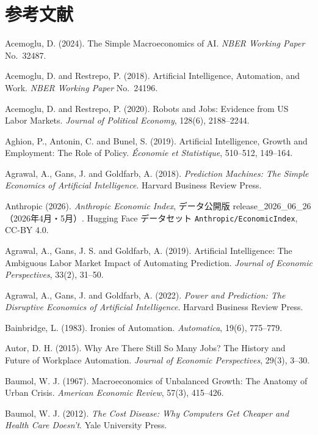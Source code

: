 \documentclass[11pt]{article}
\theoremstyle{plain}
\theoremstyle{definition}
\theoremstyle{remark}
\begin{document}
\section*{参考文献}
\small
\begin{list}{}{\setlength{\leftmargin}{1.4em}\setlength{\itemindent}{-1.4em}\setlength{\itemsep}{2pt}}
\item Acemoglu, D. (2024). The Simple Macroeconomics of AI. \textit{NBER Working Paper} No.\ 32487.
\item Acemoglu, D. and Restrepo, P. (2018). Artificial Intelligence, Automation, and Work. \textit{NBER Working Paper} No.\ 24196.
\item Acemoglu, D. and Restrepo, P. (2020). Robots and Jobs: Evidence from US Labor Markets. \textit{Journal of Political Economy}, 128(6), 2188--2244.
\item Aghion, P., Antonin, C. and Bunel, S. (2019). Artificial Intelligence, Growth and Employment: The Role of Policy. \textit{Économie et Statistique}, 510--512, 149--164.
\item Agrawal, A., Gans, J. and Goldfarb, A. (2018). \textit{Prediction Machines: The Simple Economics of Artificial Intelligence}. Harvard Business Review Press.
\item Anthropic (2026). \textit{Anthropic Economic Index}, データ公開版 release\_2026\_06\_26（2026年4月・5月）. Hugging Face データセット \texttt{Anthropic/EconomicIndex}, CC-BY 4.0.
\item Agrawal, A., Gans, J. S. and Goldfarb, A. (2019). Artificial Intelligence: The Ambiguous Labor Market Impact of Automating Prediction. \textit{Journal of Economic Perspectives}, 33(2), 31--50.
\item Agrawal, A., Gans, J. and Goldfarb, A. (2022). \textit{Power and Prediction: The Disruptive Economics of Artificial Intelligence}. Harvard Business Review Press.
\item Bainbridge, L. (1983). Ironies of Automation. \textit{Automatica}, 19(6), 775--779.
\item Autor, D. H. (2015). Why Are There Still So Many Jobs? The History and Future of Workplace Automation. \textit{Journal of Economic Perspectives}, 29(3), 3--30.
\item Baumol, W. J. (1967). Macroeconomics of Unbalanced Growth: The Anatomy of Urban Crisis. \textit{American Economic Review}, 57(3), 415--426.
\item Baumol, W. J. (2012). \textit{The Cost Disease: Why Computers Get Cheaper and Health Care Doesn't}. Yale University Press.

\end{list}
\end{document}
